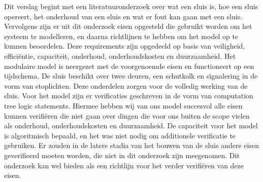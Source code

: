 \documentclass[../verslag.tex]{subfiles}
\begin{document}
Dit verslag begint met een literatuuronderzoek over wat een sluis is, hoe een sluis opereert, het onderhoud van een sluis en wat er fout kan gaan met een sluis. Vervolgens zijn er uit dit onderzoek eisen opgesteld die gebruikt worden om het systeem te modelleren, en daarna richtlijnen te hebben om het model op te kunnen beoordelen. Deze requirements zijn opgedeeld op basis van veiligheid, efficiëntie, capaciteit, onderhoud, onderhoudskosten en duurzaamheid. 
Het modulaire model is neergezet met de voorgenoemde eisen en functioneert op een tijdschema. De sluis beschikt over twee deuren, een schutkolk en signalering in de vorm van stoplichten. Deze onderdelen zorgen voor de volledig werking van de sluis.
Voor het model zijn er verificaties geschreven in de vorm van computation tree logic statements. Hiermee hebben wij van ons model succesvol alle eisen kunnen verifiëren die niet gaan over dingen die voor ons buiten de scope vielen als onderhoud, onderhoudskosten en duurzaamheid. De capaciteit voor het model is algoritmisch bepaald, en het was niet nodig om additionele verificatie te gebruiken.
Er zouden in de latere stadia van het bouwen van de sluis andere eisen geverifieerd moeten worden, die niet in dit onderzoek zijn meegenomen. Dit onderzoek kan wel bieden als een richtlijn voor het verder verifiëren van deze eisen.
\end{document}
